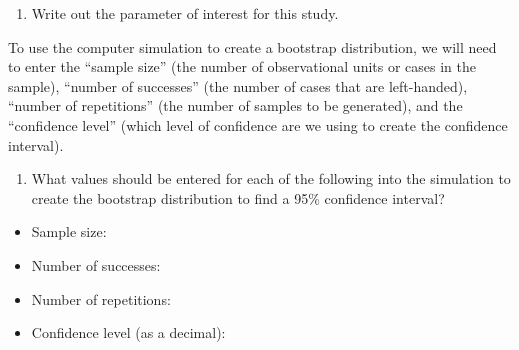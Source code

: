 \documentclass[
]{report}
\providecommand{\tightlist}{%
  \setlength{\itemsep}{0pt}\setlength{\parskip}{0pt}}
\begin{document}
\begin{enumerate}
\def\labelenumi{\arabic{enumi}.}
\setcounter{enumi}{4}
\tightlist
\item
  Write out the parameter of interest for this study.
\end{enumerate}

\vspace{0.5in}

To use the computer simulation to create a bootstrap distribution, we will need to enter the ``sample size'' (the number of observational units or cases in the sample), ``number of successes'' (the number of cases that are left-handed), ``number of repetitions'' (the number of samples to be generated), and the ``confidence level'' (which level of confidence are we using to create the confidence interval).

\begin{enumerate}
\def\labelenumi{\arabic{enumi}.}
\setcounter{enumi}{5}
\tightlist
\item
  What values should be entered for each of the following into the simulation to create the bootstrap distribution to find a 95\% confidence interval?
  \vspace{1mm}
\end{enumerate}

\begin{itemize}
\tightlist
\item
  Sample size:
\end{itemize}

\vspace{.1in}

\begin{itemize}
\tightlist
\item
  Number of successes:
\end{itemize}

\vspace{.1in}

\begin{itemize}
\tightlist
\item
  Number of repetitions:
\end{itemize}

\vspace{.1in}

\begin{itemize}
\tightlist
\item
  Confidence level (as a decimal):
\end{itemize}

\vspace{.1in}
\end{document}
